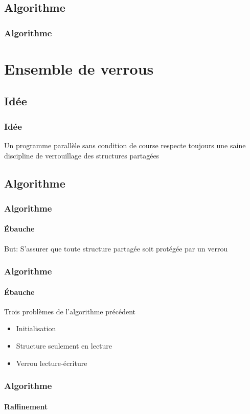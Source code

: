 \documentclass{beamer}
\begin{document}
\subsection{Algorithme}
\begin{frame}
\frametitle{Algorithme}

\end{frame}

\section{Ensemble de verrous}
\subsection{Idée}
\begin{frame}
\frametitle{Idée}
Un programme parallèle sans condition de course respecte toujours une saine discipline de verrouillage des structures partagées
\end{frame}

\subsection{Algorithme}
\begin{frame}
\frametitle{Algorithme}
\framesubtitle{Ébauche}
But: S'assurer que toute structure partagée soit protégée par un verrou
\end{frame}

\begin{frame}
\frametitle{Algorithme}
\framesubtitle{Ébauche}
Trois problèmes de l'algorithme précédent
\begin{itemize}
\item Initialisation
\item Structure seulement en lecture
\item Verrou lecture-écriture
\end{itemize}
\end{frame}

\begin{frame}
\frametitle{Algorithme}
\framesubtitle{Raffinement}
\begin{center}
\end{center}
\end{frame}
\end{document}
